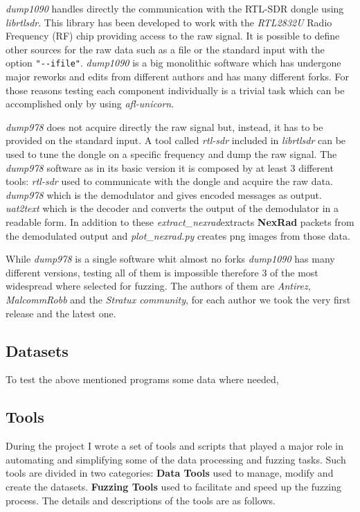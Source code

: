 \documentclass[../main.tex]{subfiles}
\begin{document}
\emph{dump1090} handles directly the communication with the RTL-SDR dongle using \emph{librtlsdr}. This library has been developed to work with the \emph{RTL2832U} Radio Frequency (RF) chip providing access to the raw signal. It is possible to define other sources for the raw data such as a file or the standard input with the option \texttt{"-{}-ifile"}. \emph{dump1090} is a big monolithic software which has undergone major reworks and edits from different authors and has many different forks. For those reasons testing each component individually is a trivial task which can be accomplished only by using \textit{afl-unicorn}.

\emph{dump978} does not acquire directly the raw signal but, instead, it has to be provided on the standard input. A tool called \textit{rtl-sdr} included in \textit{librtlsdr} can be used to tune the dongle on a specific frequency and dump the raw signal. The \textit{dump978} software as in its basic version it is composed by at least 3 different tools: \textit{rtl-sdr} used to communicate with the dongle and acquire the raw data. \textit{dump978} which is the demodulator and gives encoded messages as output. \textit{uat2text} which is the decoder and converts the output of the demodulator in a readable form. In addition to these \textit{extract\_nexrad}extracts \textbf{NexRad} packets from the demodulated output and \textit{plot\_nexrad.py} creates png images from those data.

While \textit{dump978} is a single software whit almost no forks \textit{dump1090} has many different versions, testing all of them is impossible therefore 3 of the most widespread where selected for fuzzing. The authors of them are \textit{Antirez, MalcommRobb} and the \textit{Stratux community}, for each author we took the very first release and the latest one.

\subsection{Datasets}

To test the above mentioned programs some data where needed,

\subsection{Tools}
\label{sec:tools}

During the project I wrote a set of tools and scripts that played a major role
in automating and simplifying some of the data processing and fuzzing tasks.
Such tools are divided in two categories: \textbf{Data Tools} used to manage,
modify and create the datasets. \textbf{Fuzzing Tools} used to facilitate and
speed up the fuzzing process. The details and descriptions of the tools are as
follows.
\bigskip
\end{document}
